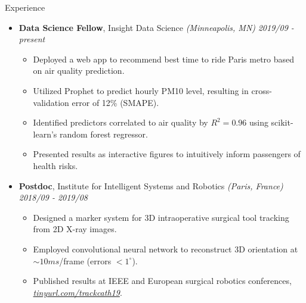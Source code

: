 \documentclass{resume} %
\begin{document}
\begin{rSection}{Experience}
	
	\begin{itemize}
	\item {\bf Data Science Fellow}{, Insight Data Science \textit{(Minneapolis, MN)}} \hfill {\em 2019/09 - present}\\
	\vspace{-5mm}
	\begin{itemize}
		\setlength\itemsep{-1.75em}
		\item Deployed a web app to recommend best time to ride Paris metro based on air quality prediction.\\
		\item Utilized Prophet to predict hourly PM10 level, resulting in cross-validation error of 12\% (SMAPE).\\
		\item Identified predictors correlated to air quality by $R^2 = 0.96$ using scikit-learn's random forest regressor.\\
		\item Presented results as interactive figures to intuitively inform passengers of health risks.
	\end{itemize}	
	
	\item {\bf Postdoc}{, Institute for Intelligent Systems and Robotics \textit{(Paris, France)}} \hfill {\em 2018/09 - 2019/08}\\
	\vspace{-5mm}
	\begin{itemize}
		\setlength\itemsep{-1.75em}
		\item  Designed a marker system for 3D intraoperative surgical tool tracking from 2D X-ray images.\\ 
		\item  Employed convolutional neural network to reconstruct 3D orientation at $\sim 10 ms$/frame (errors $< 1 ^\circ$).\\
		\item  Published results at IEEE and European surgical robotics conferences, \textit{\href{tinyurl.com/trackcath19}{tinyurl.com/trackcath19}}.
	\end{itemize}
	

\end{itemize}
\end{rSection}
\end{document}
